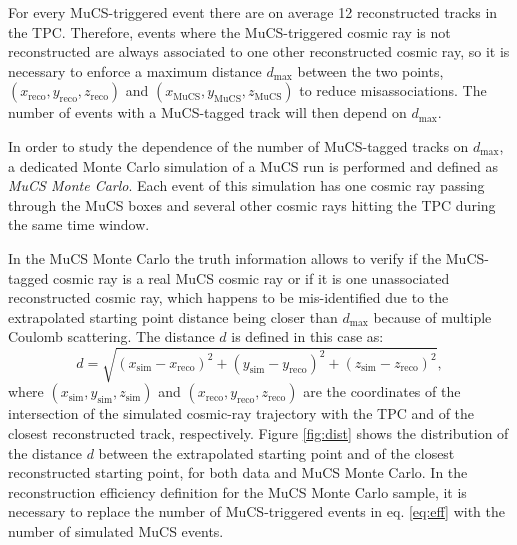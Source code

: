 \documentclass[a4paper,11pt]{article}
\begin{document}
For every MuCS-triggered event there are on average 12 reconstructed tracks in the TPC. Therefore, events where the MuCS-triggered cosmic ray is not reconstructed are always associated to one other reconstructed cosmic ray, so it is necessary to enforce a maximum distance $d_{\mathrm{max}}$ between the two points, $(x_{\mathrm{reco}},y_{\mathrm{reco}},z_{\mathrm{reco}})$ and $(x_{\mathrm{MuCS}},y_{\mathrm{MuCS}},z_{\mathrm{MuCS}})$ to reduce misassociations. The number of events with a MuCS-tagged track will then depend on $d_{\mathrm{max}}$.

In order to study the dependence of the number of MuCS-tagged tracks on $d_{\mathrm{max}}$, a dedicated Monte Carlo simulation of a MuCS run is performed and defined as \emph{MuCS Monte Carlo}. Each event of this simulation has one cosmic ray passing through the MuCS boxes and several other cosmic rays hitting the TPC during the same time window.

In the MuCS Monte Carlo the truth information allows to verify if the MuCS-tagged cosmic ray is a real MuCS cosmic ray or if it is one unassociated reconstructed cosmic ray, which happens to be mis-identified due to the extrapolated starting point distance being closer than $d_{\mathrm{max}}$ because of multiple Coulomb scattering.
The distance $d$ is defined in this case as:
\begin{equation}\label{eq:d_mc}
d = \sqrt{(x_{\mathrm{sim}}-x_{\mathrm{reco}})^2+(y_{\mathrm{sim}}-y_{\mathrm{reco}})^2+(z_{\mathrm{sim}}-z_{\mathrm{reco}})^2},
\end{equation}
where $(x_{\mathrm{sim}},y_{\mathrm{sim}},z_{\mathrm{sim}})$ and $(x_{\mathrm{reco}},y_{\mathrm{reco}},z_{\mathrm{reco}})$ are the coordinates of the intersection of the simulated cosmic-ray trajectory with the TPC and of the closest reconstructed track, respectively. Figure \ref{fig:dist} shows the distribution of the distance $d$ between the extrapolated starting point and of the closest reconstructed starting point, for both data and MuCS Monte Carlo.
In the reconstruction efficiency definition for the MuCS Monte Carlo sample, it is necessary to replace the number of MuCS-triggered events in eq. \eqref{eq:eff} with the number of simulated MuCS events.
\end{document}
